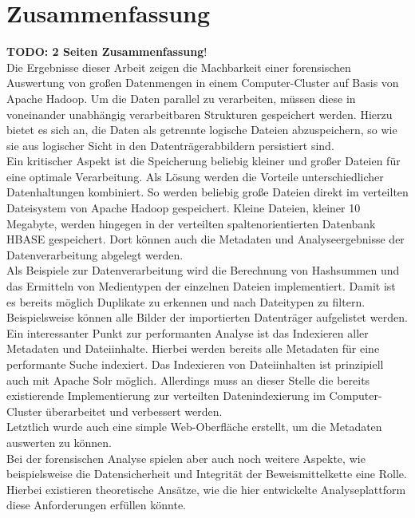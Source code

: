 \chapter{Zusammenfassung}
\label{ch:zusammenfassung}
\textbf{TODO: 2 Seiten Zusammenfassung}!\\

Die Ergebnisse dieser Arbeit zeigen die Machbarkeit einer forensischen Auswertung von großen Datenmengen in einem Computer-Cluster auf Basis von Apache Hadoop. Um die Daten parallel zu verarbeiten, müssen diese in voneinander unabhängig verarbeitbaren Strukturen gespeichert werden. Hierzu bietet es sich an, die Daten als getrennte logische Dateien abzuspeichern, so wie sie aus logischer Sicht in den Datenträgerabbildern persistiert sind.\\
Ein kritischer Aspekt ist die Speicherung beliebig kleiner und großer Dateien für eine optimale Verarbeitung. Als Lösung werden die Vorteile unterschiedlicher Datenhaltungen kombiniert. So werden beliebig große Dateien direkt im verteilten Dateisystem von Apache Hadoop gespeichert. Kleine Dateien, kleiner 10 Megabyte, werden hingegen in der verteilten spaltenorientierten Datenbank HBASE gespeichert. Dort können auch die Metadaten und Analyseergebnisse der Datenverarbeitung abgelegt werden.\\

\noindent
Als Beispiele zur Datenverarbeitung wird die Berechnung von Hashsummen und das Ermitteln von Medientypen der einzelnen Dateien implementiert. Damit ist es bereits möglich Duplikate zu erkennen und nach Dateitypen zu filtern. Beispielsweise können alle Bilder der importierten Datenträger aufgelistet werden.\\
Ein interessanter Punkt zur performanten Analyse ist das Indexieren aller Metadaten und Dateiinhalte. Hierbei werden bereits alle Metadaten für eine performante Suche indexiert. Das Indexieren von Dateiinhalten ist prinzipiell auch mit Apache Solr möglich. Allerdings  muss an dieser Stelle die bereits existierende Implementierung zur verteilten Datenindexierung im Computer-Cluster überarbeitet und verbessert werden.\\

\noindent
Letztlich wurde auch eine simple Web-Oberfläche erstellt, um die Metadaten auswerten zu können.\\
Bei der forensischen Analyse spielen aber auch noch weitere Aspekte, wie beispielsweise die Datensicherheit und Integrität der Beweismittelkette eine Rolle. Hierbei existieren theoretische Ansätze, wie die hier entwickelte Analyseplattform diese Anforderungen erfüllen könnte.\\

